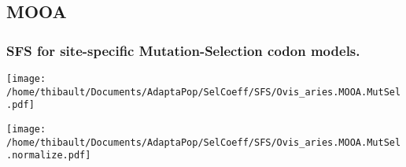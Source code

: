 \subsection{MOOA} 
 
\subsubsection*{SFS for site-specific Mutation-Selection codon models.} 
\begin{minipage}{0.49\linewidth} 
\texttt{[image: /home/thibault/Documents/AdaptaPop/SelCoeff/SFS/Ovis\_aries.MOOA.MutSel.pdf]} 
\end{minipage}
\begin{minipage}{0.49\linewidth}
\texttt{[image: /home/thibault/Documents/AdaptaPop/SelCoeff/SFS/Ovis\_aries.MOOA.MutSel.normalize.pdf]} 
\end{minipage}
\\ 
